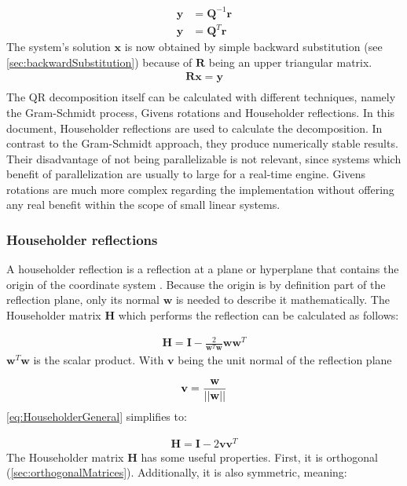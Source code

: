 \begin{align*}
\mathbf{y} &= \mathbf{Q}^{-1}\mathbf{r}\\
\mathbf{y} &= \mathbf{Q}^T\mathbf{r}
\end{align*}
%
The system's solution $\mathbf{x}$ is now obtained by simple backward substitution (see \cref{sec:backwardSubstitution}) because of $\mathbf{R}$ being an upper triangular matrix.
\begin{align*}
\mathbf{R}\mathbf{x} = \mathbf{y}\\
\end{align*}
%
The QR decomposition itself can be calculated with different techniques, namely the Gram-Schmidt process, Givens rotations and Householder reflections.
In this document, Householder reflections are used to calculate the decomposition.
In contrast to the Gram-Schmidt approach, they produce numerically stable results.
Their disadvantage of not being parallelizable is not relevant, since systems which benefit of parallelization are usually to large for a real-time engine.
Givens rotations are much more complex regarding the implementation without offering any real benefit within the scope of small linear systems. 
 

\subsubsection{Householder reflections}

A householder reflection is a reflection at a plane or hyperplane that contains the origin of the coordinate system .
Because the origin is by definition part of the reflection plane, only its normal $\mathbf{w}$ is needed to describe it mathematically.
The Householder matrix $\mathbf{H}$ which performs the reflection can be calculated as follows:



\begin{align}
\label{eq:HouseholderGeneral}
\mathbf{H} = \mathbf{I} - \frac{2}{\mathbf{w}^T\mathbf{w}}\mathbf{w}\mathbf{w}^T
\end{align}
%
$\mathbf{w}^T\mathbf{w}$ is the scalar product. With $\mathbf{v}$ being the unit normal of the reflection plane

\begin{align*}
	\mathbf{v} = \frac{\mathbf{w}}{\left\vert\left\vert\mathbf{w}\right\vert\right\vert}
\end{align*}
%
\cref{eq:HouseholderGeneral} simplifies to:

\begin{align}
\label{eq:HouseholderGeneral}
\mathbf{H} = \mathbf{I} - 2\mathbf{v}\mathbf{v}^T
\end{align}
%
The Householder matrix $\mathbf{H}$ has some useful properties.
First, it is orthogonal (\cref{sec:orthogonalMatrices}).
Additionally, it is also symmetric, meaning:

